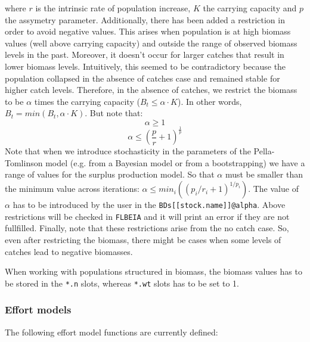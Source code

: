   \noindent where $r$ is the intrinsic rate of population increase, $K$ the carrying capacity and $p$ the assymetry parameter.
  Additionally, there has been added a restriction in order to avoid negative values.
  This arises when population is at high biomass values (well above carrying capacity) 
  and outside the range of observed biomass levels in the past. 
  Moreover, it doesn't occur for larger catches that result in lower biomass levels. 
  Intuitively, this seemed to be contradictory because the population collapsed in the absence of catches case 
  and remained stable for higher catch levels. 
  Therefore, in the absence of catches, we restrict the biomass to be $\alpha$ times the carrying capacity 
  ($B_t \leq \alpha \cdot K$). 
  In other words, $B_t = min(B_t, \alpha \cdot K)$. But note that:
   $$ \alpha \geq 1 $$
   $$ \alpha \leq \left(\frac{p}{r}+1\right)^{\frac{1}{p}}$$
	Note that when we introduce stochasticity in the parameters of the Pella-Tomlinson model 
	(e.g. from a Bayesian model or from a bootstrapping) we have a range of values for the surplus production model. 
	So that $\alpha$ must be smaller than the minimum value across iterations: $\alpha \leq min_i((p_i/r_i+1)^{1/p_i})$.
  The value of $\alpha$ has to be introduced by the user in the \texttt{BDs[[stock.name]]@alpha}.
  Above restrictions will be checked in \texttt{FLBEIA} and it will print an error if they are not fullfilled.
  Finally, note that these restrictions arise from the no catch case. 
  So, even after restricting the biomass, there might be cases when some levels of catches lead to negative biomasses. 

  When working with populations structured in biomass, the biomass values has to be stored in the \texttt{*.n} slots, whereas \texttt{*.wt} slots has to be set to 1.

\subsubsection{Effort models}

  The following effort model functions are currently defined:

